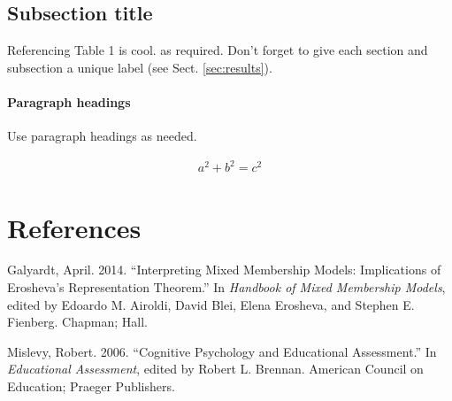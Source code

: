 \documentclass[smallextended]{svjour3}       %
\begin{document}
\subsection{Subsection title}\label{sec:2}

Referencing Table 1 is cool. as required. Don't forget to give each
section and subsection a unique label (see Sect. \ref{sec:results}).

\paragraph{Paragraph headings}\label{paragraph-headings-1}

Use paragraph headings as needed.

\begin{align}
a^2+b^2=c^2
\end{align}

\section*{References}\label{references}

\hypertarget{refs}{}
\hypertarget{ref-Galyardt14mmm}{}
Galyardt, April. 2014. ``Interpreting Mixed Membership Models:
Implications of Erosheva's Representation Theorem.'' In \emph{Handbook
of Mixed Membership Models}, edited by Edoardo M. Airoldi, David Blei,
Elena Erosheva, and Stephen E. Fienberg. Chapman; Hall.

\hypertarget{ref-Mislevy06Cog}{}
Mislevy, Robert. 2006. ``Cognitive Psychology and Educational
Assessment.'' In \emph{Educational Assessment}, edited by Robert L.
Brennan. American Council on Education; Praeger Publishers.



\end{document}
